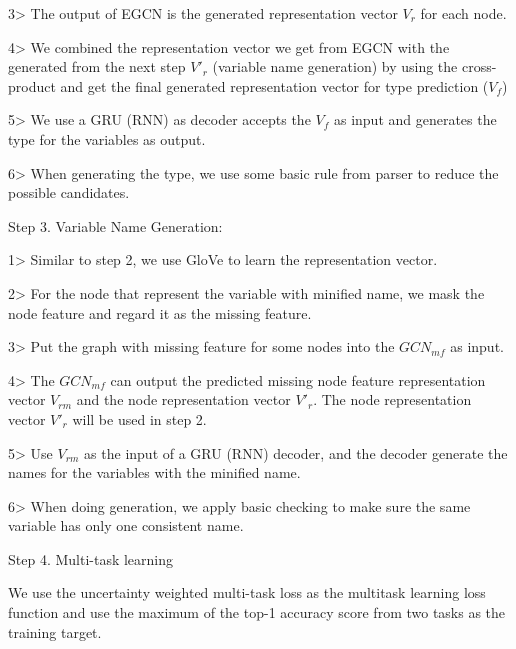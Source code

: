 3> The output of EGCN is the generated representation vector $V_r$ for each node. 

4> We combined the representation vector we get from EGCN with the generated from the next step $V'_r$ (variable name generation) by using the cross-product and get the final generated representation vector for type prediction ($V_f$)

5> We use a GRU (RNN) as decoder accepts the $V_f$ as input and generates the type for the variables as output.

6> When generating the type, we use some basic rule from parser to reduce the possible candidates.

Step 3. Variable Name Generation:

1> Similar to step 2, we use GloVe to learn the representation vector.

2> For the node that represent the variable with minified name, we mask the node feature and regard it as the missing feature.

3> Put the graph with missing feature for some nodes into the $GCN_{mf}$ as input. 

4> The $GCN_{mf}$ can output the predicted missing node feature representation vector $V_{rm}$ and the node representation vector $V'_r$. The node representation vector $V'_r$ will be used in step 2.

5> Use $V_{rm}$ as the input of a GRU (RNN) decoder, and the decoder generate the names for the variables with the minified name.

6> When doing generation, we apply basic checking to make sure the same variable has only one consistent name.

Step 4. Multi-task learning

We use the uncertainty weighted multi-task loss as the multitask learning loss function and use the maximum of the top-1 accuracy score from two tasks as the training target.
 
